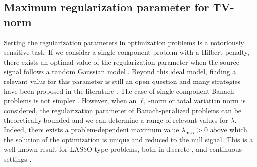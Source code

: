 \documentclass[12pt]{article}
\begin{document}

    \subsection{Maximum regularization parameter for TV-norm}

    Setting the regularization parameters in optimization problems is a notoriously sensitive task. 
    If we consider a single-component problem with a Hilbert penalty, there exists an optimal value of the regularization parameter when the source signal follows a random Gaussian model \cite{Badou}. Beyond this ideal model, finding a relevant value for this parameter is still an open question and many strategies have been proposed in the literature \cite{hansen2000,park2008parameter}. The case of single-component Banach problems is not simpler \cite{deladalle2014sugar,chirinos2024parameter}. 
    However, when an $\ell_1$-norm or total variation norm is considered, the regularization parameter of Banach-penalized problems can be theoretically bounded and we can determine a range of relevant values for $\lambda$. Indeed, there exists a problem-dependent maximum value $\lambda_{\mathrm{max}} > 0$ above which the solution of the optimization is unique and reduced to the null signal. This is a well-known result for LASSO-type problems, both in discrete \cite{tibshirani2013lasso}, \cite[Proposition~II.1]{koulouri2021} and continuous settings \cite[Proposition~10]{debarre2022sparsest}.
\end{document}
